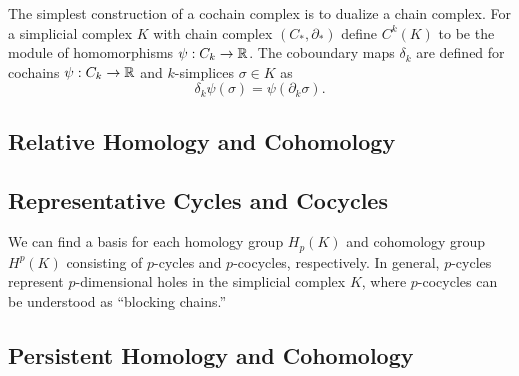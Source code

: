 The simplest construction of a cochain complex is to dualize a chain complex.
For a simplicial complex $K$ with chain complex $(C_*,\partial_*)$ define $C^k(K)$ to be the module of homomorphisms $\psi:C_k\to\mathbb{R}$.
The coboundary maps $\delta_k$ are defined for cochains $\psi:C_k\to\mathbb{R}$ and $k$-simplices $\sigma\in K$ as
\[\delta_k\psi(\sigma) = \psi(\partial_k\sigma).\]


\subsection{Relative Homology and Cohomology}

\subsection{Representative Cycles and Cocycles}

We can find a basis for each homology group $H_p(K)$ and cohomology group $H^p(K)$ consisting of $p$-cycles and $p$-cocycles, respectively.
In general, $p$-cycles represent $p$-dimensional holes in the simplicial complex $K$, where $p$-cocycles can be understood as ``blocking chains.''

\subsection{Persistent Homology and Cohomology}

